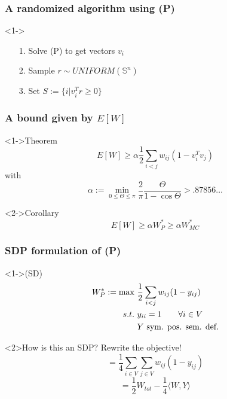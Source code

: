 \documentclass[11pt]{beamer}
\begin{document}
	\begin{frame}\frametitle{A randomized algorithm using (P)}
		\begin{block}<1->{}
		\begin{itemize}
				\item[1.]{Solve (P) to get vectors $v_i$}
				\item[2.]{Sample $r \sim UNIFORM(\mathbb S^n)$}
				\item[3.]{Set $S:=\{i | v_i^Tr\geq 0\}$}
		\end{itemize}
		\end{block}
	\end{frame}

	\begin{frame}\frametitle{A bound given by $E[W]$}
		\begin{block}<1->{Theorem}
			$$ E[W] \geq \alpha \frac{1}{2} \sum_{i<j}w_{ij}(1-v_i^Tv_j)$$
			with
			$$ \alpha:= \min_{0\leq \Theta \leq \pi}\frac{2}{\pi}\frac{\Theta}{1-\cos \Theta} > .87856\dots$$
		\end{block}
		\begin{block}<2->{Corollary}
			$$ E[W] \geq \alpha W_{P}^* \geq \alpha W_{MC}^* $$
		\end{block}	
	\end{frame}

		\begin{frame}\frametitle{SDP formulation of (P)}
		\begin{block}<1->{(SD) }
			\begin{equation*}
				\begin{aligned}
				W_P^*:= \max \ &\frac{1}{2}\sum_{i<j}w_{ij}(1-y_{ij})\\
				s.t. \ &y_{ii} = 1 \qquad \forall i\in V\\
					 & Y \ \textnormal{sym. pos. sem. def.}
				\end{aligned}
			\end{equation*}
		\end{block}
	    \begin{block}{How is this an SDP? Rewrite the objective!}
	    $$ = \frac{1}{4}\sum_{i\in V}\sum_{j\in V}w_{ij}(1-y_{ij})$$
	    $$ = \frac{1}{2}W_{tot} - \frac{1}{4}\langle W,Y \rangle$$
	    \end{block}
	\end{frame}
\end{document}
